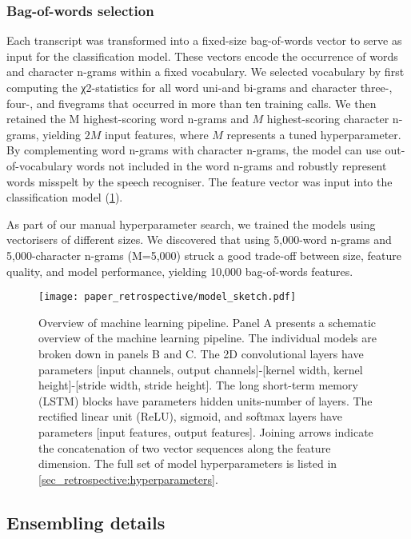 {\subsubsection{Bag-of-words selection}

Each transcript was transformed into a fixed-size bag-of-words vector to serve as input for the classification model. These vectors encode the occurrence of words and character n-grams within a fixed vocabulary. We selected vocabulary by first computing the χ2-statistics for all word uni-and bi-grams and character three-, four-, and fivegrams that occurred in more than ten training calls. We then retained the M highest-scoring word n-grams and $M$ highest-scoring character n-grams, yielding $2M$ input features, where $M$ represents a tuned hyperparameter. By complementing word n-grams with character n-grams, the model can use out-of-vocabulary words not included in the word n-grams and robustly represent words misspelt by the speech recogniser. The feature vector was input into the classification model (\cref{fig_retrospective:model_sketch}).

As part of our manual hyperparameter search, we trained the models using vectorisers of different sizes. We discovered that using 5,000-word n-grams and 5,000-character n-grams (M=5,000) struck a good trade-off between size, feature quality, and model performance, yielding 10,000 bag-of-words features.

\begin{figure}[h]
    \centering
    \texttt{[image: paper\_retrospective/model\_sketch.pdf]}
    \caption[Overview of machine learning pipeline for stroke recognition.]{Overview of machine learning pipeline. Panel A presents a schematic overview of the machine learning pipeline. The individual models are broken down in panels B and C. The 2D convolutional layers have parameters [input channels, output channels]-[kernel width, kernel height]-[stride width, stride height]. The long short-term memory (LSTM) blocks have parameters hidden units-number of layers. The rectified linear unit (ReLU), sigmoid, and softmax layers have parameters [input features, output features]. Joining arrows indicate the concatenation of two vector sequences along the feature dimension. The full set of model hyperparameters is listed in \cref{sec_retrospective:hyperparameters}.}
    \label{fig_retrospective:model_sketch}
\end{figure}

\subsection{Ensembling details}

}
